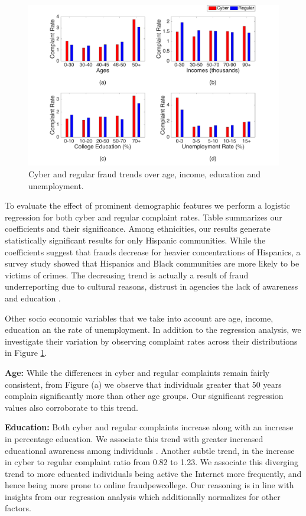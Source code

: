 \documentclass[conference]{IEEEtran}
\begin{document}
\begin{figure}[b]
\centering
  \includegraphics[scale=0.29]{graphics/demographics.pdf}
  \caption{Cyber and regular fraud trends over age, income, education and unemployment.}
  \label{demographics}
\end{figure}
To evaluate the effect of prominent demographic features we perform a logistic regression for both cyber and regular complaint rates. Table \label{regressions} summarizes our coefficients and their significance. Among ethnicities, our results generate statistically significant results for only Hispanic communities. While the coefficients suggest that frauds decrease for heavier concentrations of  Hispanics, a survey study \cite{anderson2013consumer} showed that Hispanics and Black communities are more likely to be victims of crimes. The decreasing trend is actually a result of fraud underreporting due to cultural reasons, distrust in agencies the lack of awareness and education \cite{consumerlessons}.

Other socio economic variables that we take into account are age, income, education an the rate of unemployment. In addition to the regression analysis, we investigate their variation by observing complaint rates across their distributions in Figure \ref{demographics}.

\textbf{Age:} While the differences in cyber and regular complaints remain fairly consistent, from Figure \cite{demographics} (a) we observe that individuals greater that 50 years complain significantly more than other age groups. Our significant regression values also corroborate to this trend. 


\textbf{Education:} Both cyber and regular complaints increase along with an increase in percentage education. We associate this trend with greater increased educational awareness among individuals \cite{consumerlessons}. Another subtle trend, in the increase in cyber to regular complaint ratio from 0.82 to 1.23. We associate this diverging trend to more educated individuals being active  the Internet  more frequently, and hence being more prone to online fraud{pewcollege}. Our reasoning is in line with insights from our regression analysis which additionally normalizes for other factors.
\end{document}

